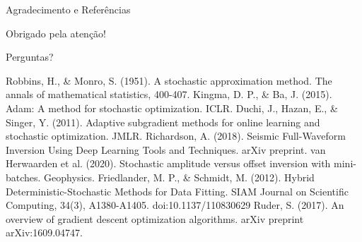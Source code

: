\documentclass[aspectratio=1610]{beamer}
\begin{document}
\begin{frame}{Agradecimento e Referências}
\begin{center}
\Large{Obrigado pela atenção!}

\vspace{1em}
\normalsize{Perguntas?}
\end{center}

\vspace{1em}
\small
\begin{thebibliography}{9}
     Robbins, H., \& Monro, S. (1951). A stochastic approximation method. The annals of mathematical statistics, 400-407.
     Kingma, D. P., \& Ba, J. (2015). Adam: A method for stochastic optimization. ICLR.
     Duchi, J., Hazan, E., \& Singer, Y. (2011). Adaptive subgradient methods for online learning and stochastic optimization. JMLR.
     Richardson, A. (2018). Seismic Full-Waveform Inversion Using Deep Learning Tools and Techniques. arXiv preprint.
     van Herwaarden et al. (2020). Stochastic amplitude versus offset inversion with mini-batches. Geophysics.
     Friedlander, M. P., \& Schmidt, M. (2012). Hybrid Deterministic-Stochastic Methods for Data Fitting. SIAM Journal on Scientific Computing, 34(3), A1380-A1405. doi:10.1137/110830629
     Ruder, S. (2017). An overview of gradient descent optimization algorithms. arXiv preprint arXiv:1609.04747.
\end{thebibliography}
\end{frame}
\end{document}
